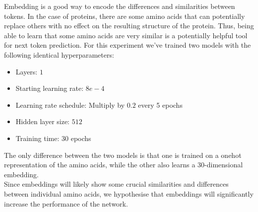 Embedding is a good way to encode the differences and similarities between tokens. In the case of proteins, there are some amino acids that can potentially replace others with no effect on the resulting structure of the protein. Thus, being able to learn that some amino acids are very similar is a potentially helpful tool for next token prediction. For this experiment we've trained two models with the following identical hyperparameters:
\begin{itemize}
	\item Layers: $1$
	\item Starting learning rate: $8e-4$
	\item Learning rate schedule: Multiply by $0.2$ every 5 epochs
	\item Hidden layer size: $512$
	\item Training time: 30 epochs
\end{itemize}
The only difference between the two models is that one is trained on a onehot representation of the amino acids, while the other also learns a 30-dimensional embedding.\\

\noindent
Since embeddings will likely show some crucial similarities and differences between individual amino acids, we hypothesise that embeddings will significantly increase the performance of the network.